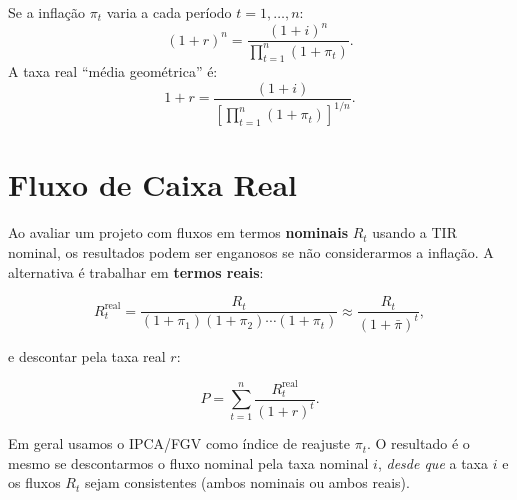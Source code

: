 Se a inflação $\pi_t$ varia a cada período $t = 1, \ldots, n$:
\[
  (1+r)^n = \frac{(1+i)^n}{\prod_{t=1}^n(1+\pi_t)}.
\]
A taxa real ``média geométrica'' é:
\[
  1 + r = \frac{(1+i)}{\left[\prod_{t=1}^n(1+\pi_t)\right]^{1/n}}.
\]

\section{Fluxo de Caixa Real}

Ao avaliar um projeto com fluxos em termos \textbf{nominais} $R_t$ usando a TIR nominal,
os resultados podem ser enganosos se não considerarmos a inflação. A alternativa é
trabalhar em \textbf{termos reais}:

\[
  R_t^{\text{real}} = \frac{R_t}{(1+\pi_1)(1+\pi_2)\cdots(1+\pi_t)}
                     \approx \frac{R_t}{(1+\bar\pi)^t},
\]

e descontar pela taxa real $r$:

\[
  P = \sum_{t=1}^n \frac{R_t^{\text{real}}}{(1+r)^t}.
\]

\begin{nota}
Em geral usamos o IPCA/FGV como índice de reajuste $\pi_t$.
O resultado é o mesmo se descontarmos o fluxo nominal pela taxa nominal $i$,
\emph{desde que} a taxa $i$ e os fluxos $R_t$ sejam consistentes (ambos nominais ou ambos reais).
\end{nota}

\begin{center}
\end{center}


